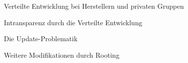 \begin{frame}

	\begin{block}{}
		Verteilte Entwicklung bei Herstellern und privaten Gruppen
	\end{block}
	\begin{block}{}
		Intransparenz durch die Verteilte Entwicklung
	\end{block}
	\begin{block}{}
		Die Update-Problematik
	\end{block}
	\begin{block}{}
		Weitere Modifikationen durch Rooting
	\end{block}

\end{frame}
